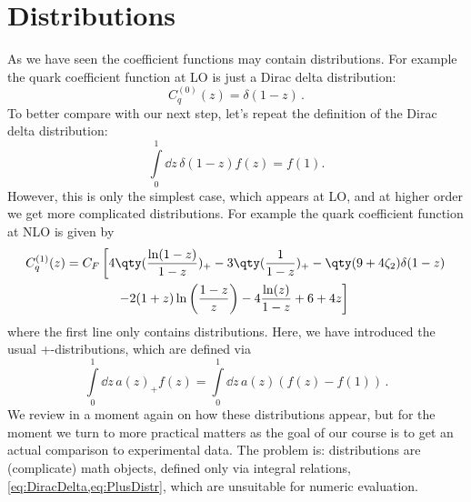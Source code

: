 \section{Distributions}

As we have seen the coefficient functions may contain distributions.
For example the quark coefficient function at LO is just a Dirac delta distribution:
\begin{equation}
    C_q^{(0)}(z) = \delta(1-z) \,.
\end{equation}
To better compare with our next step, let's repeat the definition of the Dirac delta distribution:
\begin{equation}
    \int\limits_0^1 \! \dd z\, \delta(1-z) f(z) = f(1).
    \label{eq:DiracDelta}
\end{equation}
However, this is only the simplest case, which appears at LO, and at higher order we get more complicated distributions.
For example the quark coefficient function at NLO is given by
\begin{align}
    C_q^{(1)}(z) &= C_F \left[ 4 \qty(\frac{\ln(1-z)}{1-z})_+ - 3 \qty(\frac{1}{1-z})_+ - \qty(9+4\zeta_2)\delta(1-z)\right. \nonumber\\
    & \hspace{40pt} \left. - 2(1+z)\ln\left(\frac{1-z}{z}\right) - 4 \frac{\ln(z)}{1-z} + 6 +4z\right]
\end{align}
where the first line only contains distributions. 
Here, we have introduced the usual +-distributions, which are defined via
\begin{equation}
    \int\limits_0^1 \! \dd z\, a(z)_+ f(z) = \int\limits_0^1 \! \dd z\, a(z) \left(f(z) - f(1)\right) \,.
    \label{eq:PlusDistr}
\end{equation}
We review in a moment again on how these distributions appear, but for the moment we turn to more practical matters as the goal of our course is to get an actual comparison to experimental data.
The problem is: distributions are (complicate) math objects, defined only via integral relations, \cref{eq:DiracDelta,eq:PlusDistr}, which are unsuitable for numeric evaluation.
